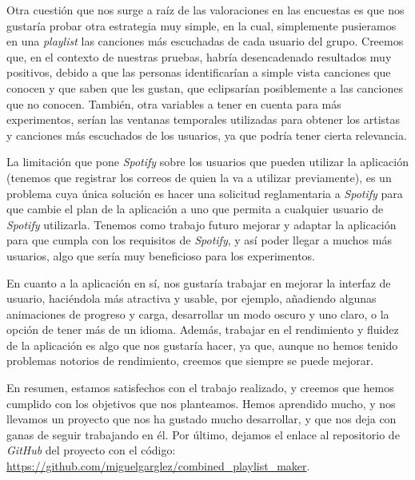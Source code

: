 Otra cuestión que nos surge a raíz de las valoraciones en las encuestas es que nos gustaría probar otra estrategia muy simple, en la cual, simplemente pusieramos en una \textit{playlist} las canciones más escuchadas
de cada usuario del grupo. Creemos que, en el contexto de nuestras pruebas, habría desencadenado resultados muy positivos, debido a que las personas identificarían a simple vista canciones que conocen y que saben que les gustan, que 
eclipsarían posiblemente a las canciones que no conocen. También, otra variables a tener en cuenta para más experimentos, serían las ventanas temporales utilizadas para obtener los artistas y canciones más escuchados de los usuarios, 
ya que podría tener cierta relevancia.

La limitación que pone \textit{Spotify} sobre los usuarios que pueden utilizar la aplicación (tenemos que registrar los correos de quien la va a utilizar previamente), es un problema cuya única solución es hacer una solicitud 
reglamentaria a \textit{Spotify} para que cambie el plan de la aplicación a uno que permita a cualquier usuario de \textit{Spotify} utilizarla. Tenemos como trabajo futuro mejorar y adaptar la aplicación para que cumpla con 
los requisitos de \textit{Spotify}, y así poder llegar a muchos más usuarios, algo que sería muy beneficioso para los experimentos.

En cuanto a la aplicación en sí, nos gustaría trabajar en mejorar la interfaz de usuario, haciéndola más atractiva y usable, por ejemplo, añadiendo algunas animaciones de progreso y carga, desarrollar un modo oscuro y uno claro,
o la opción de tener más de un idioma. Además, trabajar en el rendimiento y fluidez de la aplicación es algo que nos gustaría hacer, ya que, aunque no hemos tenido problemas notorios de rendimiento, creemos que siempre se puede mejorar.

En resumen, estamos satisfechos con el trabajo realizado, y creemos que hemos cumplido con los objetivos que nos planteamos. Hemos aprendido mucho, y nos llevamos un proyecto que nos ha gustado mucho desarrollar, 
y que nos deja con ganas de seguir trabajando en él. Por último, dejamos el enlace al repositorio de \textit{GitHub} del proyecto con el código: \url{https://github.com/miguelgarglez/combined_playlist_maker}.